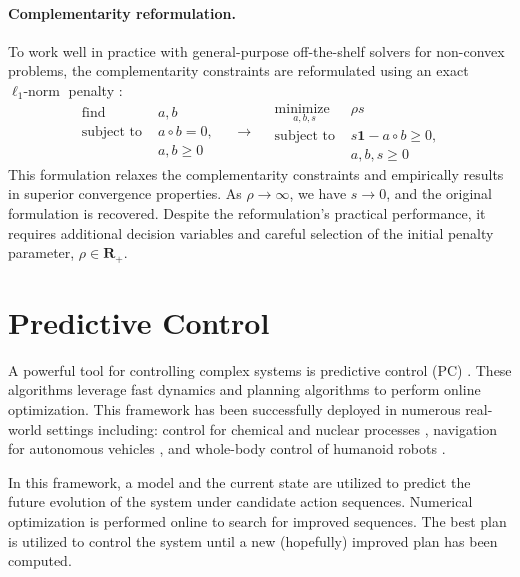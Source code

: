 \paragraph{Complementarity reformulation.} To work well in practice with general-purpose off-the-shelf solvers for non-convex problems, the complementarity constraints are reformulated using an exact $\ell_1\mbox{-norm}$ penalty \cite{manchester2020variational}:
\begin{equation}
	\begin{array}{ll}
		\underset{}{\mbox{find }}  & a, b\\
		\mbox{subject to } & a \circ b = 0, \\ 
		& a, b \geq 0
	\end{array}
	\quad
	\rightarrow 
	\quad
	\begin{array}{ll}
		\underset{a, b, s}{\mbox{minimize }}  & \rho s\\
		\mbox{subject to } & s \mathbf{1} - a \circ b \geq 0, \\
		& a, b, s \geq 0
	\end{array} \label{intro_complementarity_reformulation}
\end{equation}
This formulation relaxes the complementarity constraints and empirically results in superior convergence properties. As $\rho \rightarrow \infty$, we have $s \rightarrow 0$, and the original formulation is recovered. Despite the reformulation's practical performance, it requires additional decision variables and careful selection of the initial penalty parameter, $\rho \in \mathbf{R}_+$.

\section{Predictive Control}
A powerful tool for controlling complex systems is predictive control (PC) \cite{richalet1978model}. These algorithms leverage fast dynamics and planning algorithms to perform online optimization. This framework has been successfully deployed in numerous real-world settings including: control for chemical and nuclear processes \cite{na2003model, lopez2013fast}, navigation for autonomous vehicles \cite{falcone2007predictive}, and whole-body control of humanoid robots \cite{atlas2019parkour}.

In this framework, a model and the current state are utilized to predict the future evolution of the system under candidate action sequences. Numerical optimization is performed online to search for improved sequences. The best plan is utilized to control the system until a new (hopefully) improved plan has been computed.

